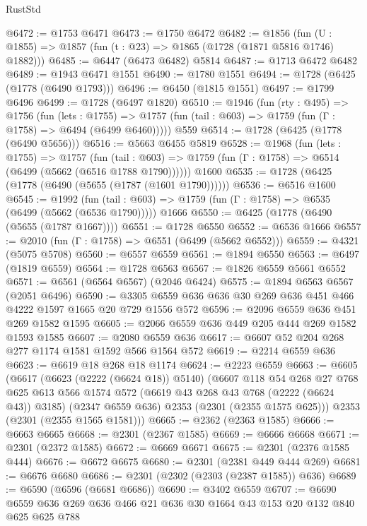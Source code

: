 \begin{lexlean}{RustStd}
\begin{coremodule}
@6472 := @1753 @6471
@6473 := @1750 @6472
@6482 := @1856 (fun (U : @1855) => @1857 (fun (t : @23) => @1865 (@1728 (@1871 @5816 @1746) @1882)))
@6485 := @6447 (@6473 @6482) @5814
@6487 := @1713 @6472 @6482
@6489 := @1943 @6471 @1551
@6490 := @1780 @1551
@6494 := @1728 (@6425 (@1778 (@6490 @1793)))
@6496 := @6450 (@1815 @1551)
@6497 := @1799 @6496
@6499 := @1728 (@6497 @1820)
@6510 := @1946
    (fun (rty : @495) =>
    @1756
      (fun (lets : @1755) =>
      @1757 (fun (tail : @603) => @1759 (fun (Γ : @1758) => @6494 (@6499 @6460)))))
    @559
@6514 := @1728 (@6425 (@1778 (@6490 @5656)))
@6516 := @5663 @6455 @5819
@6528 := @1968
    (fun (lets : @1755) =>
    @1757
      (fun (tail : @603) => @1759 (fun (Γ : @1758) => @6514 (@6499 (@5662 (@6516 @1788 @1790))))))
    @1600
@6535 := @1728 (@6425 (@1778 (@6490 (@5655 (@1787 (@1601 @1790))))))
@6536 := @6516 @1600
@6545 := @1992
    (fun (tail : @603) => @1759 (fun (Γ : @1758) => @6535 (@6499 (@5662 (@6536 @1790)))))
    @1666
@6550 := @6425 (@1778 (@6490 (@5655 (@1787 @1667))))
@6551 := @1728 @6550
@6552 := @6536 @1666
@6557 := @2010 (fun (Γ : @1758) => @6551 (@6499 (@5662 @6552)))
@6559 := @4321 (@5075 @5708)
@6560 := @6557 @6559
@6561 := @1894 @6550
@6563 := @6497 (@1819 @6559)
@6564 := @1728 @6563
@6567 := @1826 @6559 @5661 @6552
@6571 := @6561 (@6564 @6567) (@2046 @6424)
@6575 := @1894 @6563 @6567 (@2051 @6496)
@6590 := @3305 @6559 @636 @636 @30 @269 @636 @451 @466 @4222 @1597 @1665 @20 @729 @1556 @572
@6596 := @2096 @6559 @636 @451 @269 @1582 @1595
@6605 := @2066 @6559 @636 @449 @205 @444 @269 @1582 @1593 @1585
@6607 := @2080 @6559 @636
@6617 := @6607 @52 @204 @268 @277 @1174 @1581 @1592 @566 @1564 @572
@6619 := @2214 @6559 @636
@6623 := @6619 @18 @268 @18 @1174
@6624 := @2223 @6559
@6663 := @6605
    (@6617
      (@6623 (@2222 (@6624 @18)) @5140)
      (@6607
        @118
        @54
        @268
        @27
        @768
        @625
        @613
        @566
        @1574
        @572
        (@6619 @43 @268 @43 @768 (@2222 (@6624 @43)) @3185)
        (@2347 @6559 @636)
        @2353
        (@2301 (@2355 @1575 @625)))
      @2353
      (@2301 (@2355 @1565 @1581)))
@6665 := @2362 (@2363 @1585)
@6666 := @6663 @6665
@6668 := @2301 (@2367 @1585)
@6669 := @6666 @6668
@6671 := @2301 (@2372 @1585)
@6672 := @6669 @6671
@6675 := @2301 (@2376 @1585 @444)
@6676 := @6672 @6675
@6680 := @2301 (@2381 @449 @444 @269)
@6681 := @6676 @6680
@6686 := @2301 (@2302 (@2303 (@2387 @1585)) @636)
@6689 := @6590 (@6596 (@6681 @6686))
@6690 := @3402 @6559
@6707 := @6690 @6559 @636 @269 @636 @466 @21 @636 @30 @1664 @43 @153 @20 @132 @840 @625 @625 @788

\end{coremodule}
\end{lexlean}
